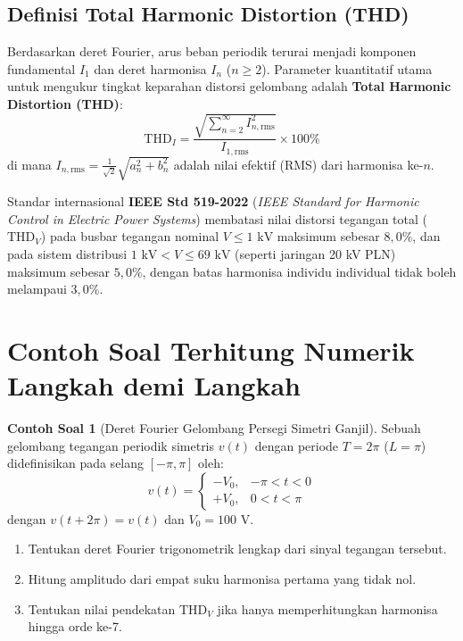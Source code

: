 \documentclass[11pt,a4paper]{article}
\theoremstyle{definition}
\newtheorem{example}{Contoh Soal}[section]
\begin{document}
\subsection{Definisi Total Harmonic Distortion (THD)}
Berdasarkan deret Fourier, arus beban periodik terurai menjadi komponen fundamental $I_1$ dan deret harmonisa $I_n$ ($n \ge 2$). Parameter kuantitatif utama untuk mengukur tingkat keparahan distorsi gelombang adalah \textbf{Total Harmonic Distortion (THD)}:
\begin{equation}
    \text{THD}_I = \frac{\sqrt{\sum_{n=2}^{\infty} I_{n,\text{rms}}^2}}{I_{1,\text{rms}}} \times 100\%
    \label{eq:thd_definition}
\end{equation}
di mana $I_{n,\text{rms}} = \frac{1}{\sqrt{2}}\sqrt{a_n^2 + b_n^2}$ adalah nilai efektif (RMS) dari harmonisa ke-$n$.

Standar internasional \textbf{IEEE Std 519-2022} (\textit{IEEE Standard for Harmonic Control in Electric Power Systems}) membatasi nilai distorsi tegangan total ($\text{THD}_V$) pada busbar tegangan nominal $V \le 1\text{ kV}$ maksimum sebesar $8{,}0\%$, dan pada sistem distribusi $1\text{ kV} < V \le 69\text{ kV}$ (seperti jaringan 20 kV PLN) maksimum sebesar $5{,}0\%$, dengan batas harmonisa individu individual tidak boleh melampaui $3{,}0\%$.

\section{Contoh Soal Terhitung Numerik Langkah demi Langkah}

\begin{example}[Deret Fourier Gelombang Persegi Simetri Ganjil]
Sebuah gelombang tegangan periodik simetris $v(t)$ dengan periode $T = 2\pi$ ($L = \pi$) didefinisikan pada selang $[-\pi, \pi]$ oleh:
\begin{equation*}
    v(t) = \begin{cases} -V_0, & -\pi < t < 0 \\ +V_0, & 0 < t < \pi \end{cases}
\end{equation*}
dengan $v(t + 2\pi) = v(t)$ dan $V_0 = 100\text{ V}$.
\begin{enumerate}[leftmargin=*]
    \item Tentukan deret Fourier trigonometrik lengkap dari sinyal tegangan tersebut.
    \item Hitung amplitudo dari empat suku harmonisa pertama yang tidak nol.
    \item Tentukan nilai pendekatan $\text{THD}_V$ jika hanya memperhitungkan harmonisa hingga orde ke-7.
\end{enumerate}
\end{example}
\end{document}
